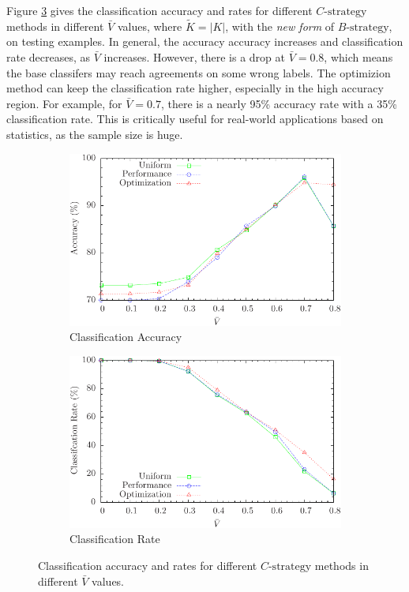 Figure \ref{fig:threshoulds} gives the classification accuracy and rates for different $C\text{-strategy}$ methods in different $\bar{V}$ values, where $\tilde{K}=|K|$, with the \emph{new form} of $B\text{-strategy}$, on testing examples. In general, the accuracy accuracy increases and classification rate decreases, as $\bar{V}$ increases. However, there is a drop at $\bar{V}=0.8$, which means the base classifers may reach agreements on some wrong labels. The optimizion method can keep the classification rate higher, especially in the high accuracy region. For example, for $\bar{V}=0.7$, there is a nearly 95\% accuracy rate with a 35\% classification rate.  This is critically useful for real-world applications based on statistics, as the sample size is huge.

\begin{figure} [htb]
\centering
\begin{subfigure}{.40\textwidth}
  \centering
  \includegraphics[width=.90\linewidth]{../Figure/threshould_accuracy}
  \caption{Classification Accuracy}
  \label{fig:threshould_accuracy}
\end{subfigure}%
\begin{subfigure}{.40\textwidth}
  \centering
  \includegraphics[width=.90\linewidth]{../Figure/threshould_rate}
  \caption{Classification Rate}
  \label{fig:threshould_rate}
\end{subfigure}
\caption{Classification accuracy and rates for different $C\text{-strategy}$ methods in different $\bar{V}$ values.}
\label{fig:threshoulds}
\end{figure}

